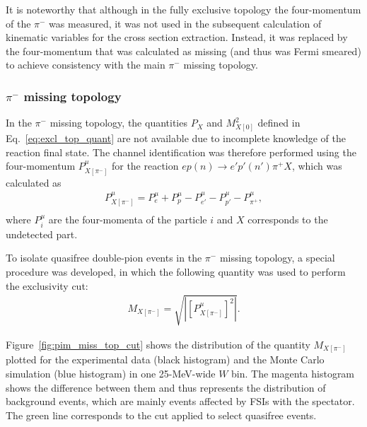 \documentclass[prc,twocolumn,superscriptaddress,showpacs,amssymb,amsmath,amsfonts,aps,nofootinbib]{revtex4-1}
\begin{document}
It is noteworthy that although in the fully exclusive topology the four-momentum of the $\pi^{-}$ was measured, it was not used in the subsequent calculation of kinematic variables for the cross section extraction. Instead, it was replaced by the four-momentum that was calculated as missing (and thus was Fermi smeared) to achieve consistency with the main $\pi^{-}$ missing topology.


\subsubsection{$\pi^{-}$ missing topology}
\label{Sect:excl_cut_pim_miss}


In the $\pi^{-}$ missing topology, the quantities $P_{X}$ and $M^{2}_{X[0]}$ defined in Eq.\!~\eqref{eq:excl_top_quant} are not available due to incomplete knowledge of the reaction final state. The channel identification was therefore performed using the four-momentum $P_{X[\pi^{-}]}^{\mu}$ for the reaction $ep(n)\rightarrow e'p'(n')\pi^{+}X$, which was calculated as
\begin{equation}
\begin{aligned}
P_{X[\pi^{-}]}^{\mu}=P_{e}^{\mu} + P_{p}^{\mu}- P_{e'}^{\mu}- P_{p'}^{\mu}-  P_{\pi^{+}}^{\mu},\\[-2pt]
\end{aligned}\label{eq:pimmiss_top_quant}
\end{equation}
where $P_{i}^{\mu}$ are the four-momenta of the particle $i$ and $X$ corresponds to the undetected part.


To isolate quasifree double-pion events in the $\pi^{-}$ missing topology, a special procedure was developed, in which the following quantity was used to perform the exclusivity cut:
\begin{equation}
\begin{aligned}
 M_{X[\pi^{-}]}=\sqrt{|[P_{X[\pi^{-}]}^{\mu}]^{2}|}.
\end{aligned}\label{eq:main_top_mm_nosq}
\end{equation}


Figure~\ref{fig:pim_miss_top_cut} shows the distribution of the quantity $M_{X[\pi^{-}]}$ plotted for the experimental data (black histogram) and the Monte Carlo simulation (blue histogram) in one 25-MeV-wide $W$ bin. The magenta histogram shows the difference between them and thus represents the distribution of background events, which are mainly events affected by FSIs with the spectator. The green line corresponds to the cut applied to select quasifree events. 
\end{document}
